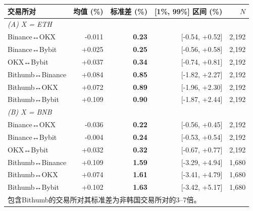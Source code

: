 \begin{tabular}{lrrrr}
\toprule
交易所对 & 均值 (\%) & 标准差 (\%) & [1\%, 99\%] 区间 (\%) & $N$ \\
\midrule
\multicolumn{5}{l}{\emph{(A) X = ETH}} \\
\quad Binance↔OKX & -0.011 & \textbf{0.23} & [-0.54, +0.52] & 2,192 \\
\quad Binance↔Bybit & +0.025 & \textbf{0.25} & [-0.56, +0.58] & 2,192 \\
\quad OKX↔Bybit & +0.037 & \textbf{0.34} & [-0.74, +0.81] & 2,192 \\
\quad Bithumb↔Binance & +0.084 & \textbf{0.85} & [-1.82, +2.27] & 2,192 \\
\quad Bithumb↔OKX & +0.072 & \textbf{0.89} & [-1.96, +2.30] & 2,192 \\
\quad Bithumb↔Bybit & +0.109 & \textbf{0.90} & [-1.87, +2.44] & 2,192 \\
\midrule
\multicolumn{5}{l}{\emph{(B) X = BNB}} \\
\quad Binance↔OKX & -0.036 & \textbf{0.22} & [-0.56, +0.45] & 2,192 \\
\quad Binance↔Bybit & -0.004 & \textbf{0.24} & [-0.53, +0.54] & 2,192 \\
\quad OKX↔Bybit & +0.032 & \textbf{0.32} & [-0.67, +0.77] & 2,192 \\
\quad Bithumb↔Binance & +0.109 & \textbf{1.59} & [-3.29, +4.94] & 1,680 \\
\quad Bithumb↔OKX & +0.074 & \textbf{1.61} & [-3.41, +4.79] & 1,680 \\
\quad Bithumb↔Bybit & +0.102 & \textbf{1.63} & [-3.42, +5.17] & 1,680 \\
\bottomrule
\multicolumn{5}{l}{\footnotesize 包含Bithumb的交易所对其标准差为非韩国交易所对的3--7倍。}\\
\end{tabular}
